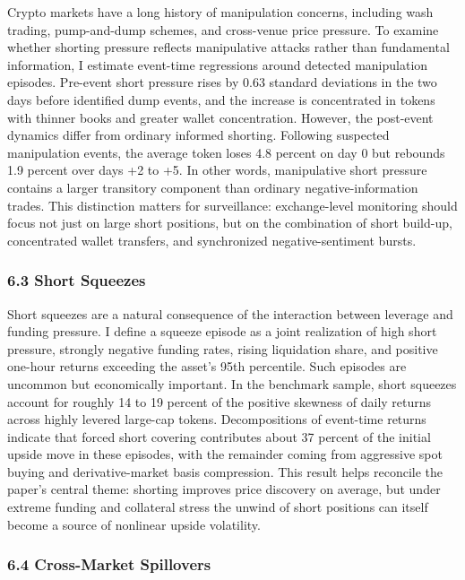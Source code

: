 \documentclass[
]{article}
\begin{document}
Crypto markets have a long history of manipulation concerns, including
wash trading, pump-and-dump schemes, and cross-venue price pressure. To
examine whether shorting pressure reflects manipulative attacks rather
than fundamental information, I estimate event-time regressions around
detected manipulation episodes. Pre-event short pressure rises by 0.63
standard deviations in the two days before identified dump events, and
the increase is concentrated in tokens with thinner books and greater
wallet concentration. However, the post-event dynamics differ from
ordinary informed shorting. Following suspected manipulation events, the
average token loses 4.8 percent on day 0 but rebounds 1.9 percent over
days +2 to +5. In other words, manipulative short pressure contains a
larger transitory component than ordinary negative-information trades.
This distinction matters for surveillance: exchange-level monitoring
should focus not just on large short positions, but on the combination
of short build-up, concentrated wallet transfers, and synchronized
negative-sentiment bursts.

\subsubsection{6.3 Short Squeezes}\label{63-short-squeezes}

Short squeezes are a natural consequence of the interaction between
leverage and funding pressure. I define a squeeze episode as a joint
realization of high short pressure, strongly negative funding rates,
rising liquidation share, and positive one-hour returns exceeding the
asset's 95th percentile. Such episodes are uncommon but economically
important. In the benchmark sample, short squeezes account for roughly
14 to 19 percent of the positive skewness of daily returns across highly
levered large-cap tokens. Decompositions of event-time returns indicate
that forced short covering contributes about 37 percent of the initial
upside move in these episodes, with the remainder coming from aggressive
spot buying and derivative-market basis compression. This result helps
reconcile the paper's central theme: shorting improves price discovery
on average, but under extreme funding and collateral stress the unwind
of short positions can itself become a source of nonlinear upside
volatility.

\subsubsection{6.4 Cross-Market
Spillovers}\label{64-cross-market-spillovers}
\end{document}

